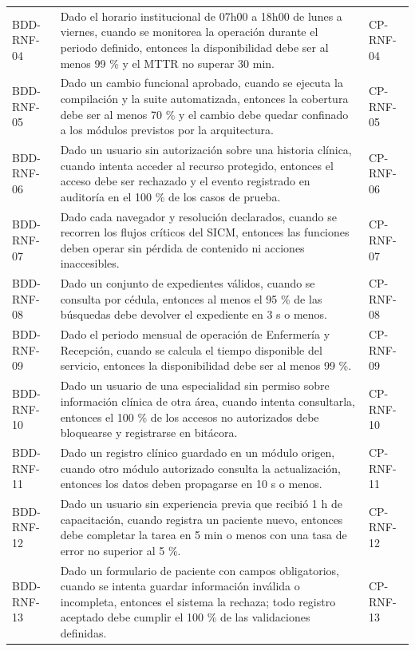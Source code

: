 \documentclass[11pt,a4paper]{article}
\begin{document}
\begin{appendices}
\begin{longtable}{p{2.8cm}p{10.6cm}p{2cm}}
			BDD-RNF-04 & Dado el horario institucional de 07h00 a 18h00 de lunes a viernes, cuando se monitorea la operación durante el periodo definido, entonces la disponibilidad debe ser al menos 99 \% y el MTTR no superar 30 min. & CP-RNF-04\\
			BDD-RNF-05 & Dado un cambio funcional aprobado, cuando se ejecuta la compilación y la suite automatizada, entonces la cobertura debe ser al menos 70 \% y el cambio debe quedar confinado a los módulos previstos por la arquitectura. & CP-RNF-05\\
			BDD-RNF-06 & Dado un usuario sin autorización sobre una historia clínica, cuando intenta acceder al recurso protegido, entonces el acceso debe ser rechazado y el evento registrado en auditoría en el 100 \% de los casos de prueba. & CP-RNF-06\\
			BDD-RNF-07 & Dado cada navegador y resolución declarados, cuando se recorren los flujos críticos del SICM, entonces las funciones deben operar sin pérdida de contenido ni acciones inaccesibles. & CP-RNF-07\\
			BDD-RNF-08 & Dado un conjunto de expedientes válidos, cuando se consulta por cédula, entonces al menos el 95 \% de las búsquedas debe devolver el expediente en 3 s o menos. & CP-RNF-08\\
			BDD-RNF-09 & Dado el periodo mensual de operación de Enfermería y Recepción, cuando se calcula el tiempo disponible del servicio, entonces la disponibilidad debe ser al menos 99 \%. & CP-RNF-09\\
			BDD-RNF-10 & Dado un usuario de una especialidad sin permiso sobre información clínica de otra área, cuando intenta consultarla, entonces el 100 \% de los accesos no autorizados debe bloquearse y registrarse en bitácora. & CP-RNF-10\\
			BDD-RNF-11 & Dado un registro clínico guardado en un módulo origen, cuando otro módulo autorizado consulta la actualización, entonces los datos deben propagarse en 10 s o menos. & CP-RNF-11\\
			BDD-RNF-12 & Dado un usuario sin experiencia previa que recibió 1 h de capacitación, cuando registra un paciente nuevo, entonces debe completar la tarea en 5 min o menos con una tasa de error no superior al 5 \%. & CP-RNF-12\\
			BDD-RNF-13 & Dado un formulario de paciente con campos obligatorios, cuando se intenta guardar información inválida o incompleta, entonces el sistema la rechaza; todo registro aceptado debe cumplir el 100 \% de las validaciones definidas. & CP-RNF-13\\

\end{longtable}
\end{appendices}
\end{document}
